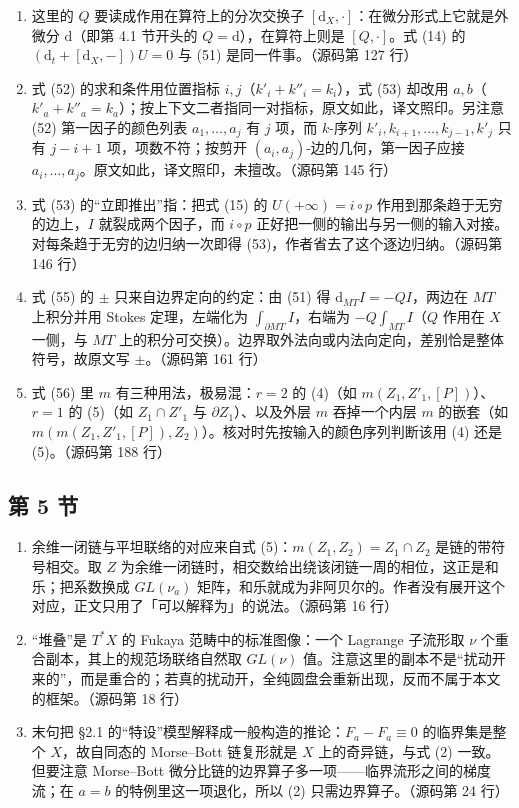 \begin{enumerate}
  \item 这里的 $Q$ 要读成作用在算符上的分次交换子 $[\mathrm{d}_X,\cdot]$：在微分形式上它就是外微分 $\mathrm{d}$（即第 4.1 节开头的 $Q=\mathrm{d}$），在算符上则是 $[Q,\cdot]$。式 (14) 的 $(\mathrm{d}_t+[\mathrm{d}_X,-])U=0$ 与 (51) 是同一件事。\hfill{\footnotesize （源码第 127 行）}
  \item 式 (52) 的求和条件用位置指标 $i,j$（$k'_i+k''_i=k_i$），式 (53) 却改用 $a,b$（$k'_a+k''_a=k_a$）；按上下文二者指同一对指标，原文如此，译文照印。另注意 (52) 第一因子的颜色列表 $a_1,\dots,a_j$ 有 $j$ 项，而 $k$-序列 $k'_i,k_{i+1},\dots,k_{j-1},k'_j$ 只有 $j-i+1$ 项，项数不符；按剪开 $(a_i,a_j)$-边的几何，第一因子应接 $a_i,\dots,a_j$。原文如此，译文照印，未擅改。\hfill{\footnotesize （源码第 145 行）}
  \item 式 (53) 的“立即推出”指：把式 (15) 的 $U(+\infty)=i\circ p$ 作用到那条趋于无穷的边上，$I$ 就裂成两个因子，而 $i\circ p$ 正好把一侧的输出与另一侧的输入对接。对每条趋于无穷的边归纳一次即得 (53)，作者省去了这个逐边归纳。\hfill{\footnotesize （源码第 146 行）}
  \item 式 (55) 的 $\pm$ 只来自边界定向的约定：由 (51) 得 $\mathrm{d}_{MT}I=-QI$，两边在 $MT$ 上积分并用 Stokes 定理，左端化为 $\int_{\partial MT}I$，右端为 $-Q\int_{MT}I$（$Q$ 作用在 $X$ 一侧，与 $MT$ 上的积分可交换）。边界取外法向或内法向定向，差别恰是整体符号，故原文写 $\pm$。\hfill{\footnotesize （源码第 161 行）}
  \item 式 (56) 里 $m$ 有三种用法，极易混：$r=2$ 的 (4)（如 $m(Z_1,Z'_1,[P])$）、$r=1$ 的 (5)（如 $Z_1\cap Z'_1$ 与 $\partial Z_1$）、以及外层 $m$ 吞掉一个内层 $m$ 的嵌套（如 $m(m(Z_1,Z'_1,[P]),Z_2)$）。核对时先按输入的颜色序列判断该用 (4) 还是 (5)。\hfill{\footnotesize （源码第 188 行）}
\end{enumerate}

\subsection*{第 5 节}
\begin{enumerate}
  \item 余维一闭链与平坦联络的对应来自式 (5)：$m(Z_1,Z_2)=Z_1\cap Z_2$ 是链的带符号相交。取 $Z$ 为余维一闭链时，相交数给出绕该闭链一周的相位，这正是和乐；把系数换成 $GL(\nu_a)$ 矩阵，和乐就成为非阿贝尔的。作者没有展开这个对应，正文只用了「可以解释为」的说法。\hfill{\footnotesize （源码第 16 行）}
  \item “堆叠”是 $T^*X$ 的 Fukaya 范畴中的标准图像：一个 Lagrange 子流形取 $\nu$ 个重合副本，其上的规范场联络自然取 $GL(\nu)$ 值。注意这里的副本不是“扰动开来的”，而是重合的；若真的扰动开，全纯圆盘会重新出现，反而不属于本文的框架。\hfill{\footnotesize （源码第 18 行）}
  \item 末句把 §2.1 的“特设”模型解释成一般构造的推论：$F_a-F_a\equiv0$ 的临界集是整个 $X$，故自同态的 Morse--Bott 链复形就是 $X$ 上的奇异链，与式 (2) 一致。但要注意 Morse--Bott 微分比链的边界算子多一项——临界流形之间的梯度流；在 $a=b$ 的特例里这一项退化，所以 (2) 只需边界算子。\hfill{\footnotesize （源码第 24 行）}
\end{enumerate}

\endinput
